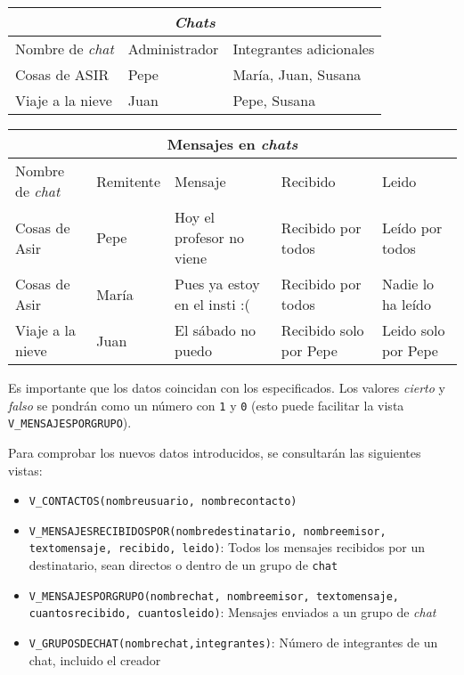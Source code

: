 \begin{homeworkProblem}
  \begin{tabular}{|l|l|l|}
    \hline
    \multicolumn{3}{|c|}{\textit{Chats}} \\
    \hline
    Nombre de \textit{chat} & Administrador & Integrantes adicionales \\
    \hline
    Cosas de ASIR & Pepe & María, Juan, Susana \\
    Viaje a la nieve & Juan & Pepe, Susana \\
    \hline
  \end{tabular}

  
  \begin{tabular}{|l|l|l|l|l|}
    \hline
    \multicolumn{5}{|c|}{Mensajes en \textit{chats}} \\
    \hline
    Nombre de \textit{chat} & Remitente & Mensaje & Recibido & Leido \\
    \hline
    Cosas de Asir & Pepe & Hoy el profesor no viene & Recibido por todos & Leído por todos \\
    Cosas de Asir & María & Pues ya estoy en el insti :( & Recibido por todos & Nadie lo ha leído \\
    Viaje a la nieve & Juan & El sábado no puedo & Recibido solo por Pepe & Leido solo por Pepe \\
    \hline
  \end{tabular}
  
  Es importante que los datos coincidan con los especificados. Los valores \textit{cierto} y \textit{falso} se pondrán como un número con \texttt{1} y \texttt{0} (esto puede facilitar la vista \texttt{V\_MENSAJESPORGRUPO}).
  

  Para comprobar los nuevos datos introducidos, se consultarán las siguientes vistas:
  
  \begin{itemize}
  \item \texttt{V\_CONTACTOS(nombreusuario, nombrecontacto)}
  
  \item \texttt{V\_MENSAJESRECIBIDOSPOR(nombredestinatario, nombreemisor, textomensaje, recibido, leido)}: Todos los mensajes recibidos por un destinatario, sean directos o dentro de un grupo de \texttt{chat}
  \item \texttt{V\_MENSAJESPORGRUPO(nombrechat, nombreemisor, textomensaje, cuantosrecibido, cuantosleido)}: Mensajes enviados a un grupo de \textit{chat}
    
  \item \texttt{V\_GRUPOSDECHAT(nombrechat,integrantes)}: Número de integrantes de un chat, incluido el creador


\end{itemize}
\end{homeworkProblem}
